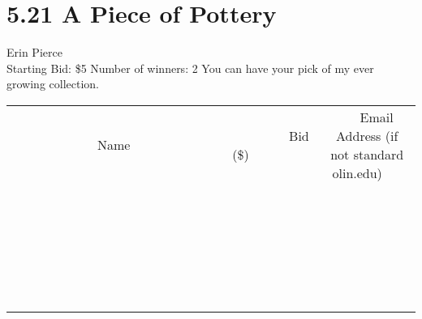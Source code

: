 \documentclass[11pt]{article}
\begin{document}
\section*{5.21 A Piece of Pottery}
Erin Pierce
\\
Starting Bid: \$5
\newline
Number of winners: 2
\newline
You can have your pick of my ever growing collection.
\\[6ex]
\begin{tabular}{c c c}
~~~~~~~~~~~~~Name~~~~~~~~~~~~~ & ~~~~~~~~~Bid (\$)~~~~~~~~~  & ~~~Email Address (if not standard olin.edu)~~~\\
 & & \\
\hline
 & & \\
\hline
 & & \\
\hline
 & & \\
\hline
 & & \\
\hline
 & & \\
\hline
 & & \\
\hline
 & & \\
\hline
 & & \\
\hline
 & & \\
\hline
 & & \\
\hline
 & & \\
\hline
 & & \\
\hline
 & & \\
\hline
 & & \\
\hline
 & & \\
\hline
 & & \\
\hline
 & & \\
\hline
 & & \\
\hline
 & & \\
\hline
 & & \\
\hline
 & & \\
\hline
 & & \\
\hline
 & & \\
\hline
 & & \\
\hline
 & & \\
\hline
\end{tabular}
\newpage
\end{document}
